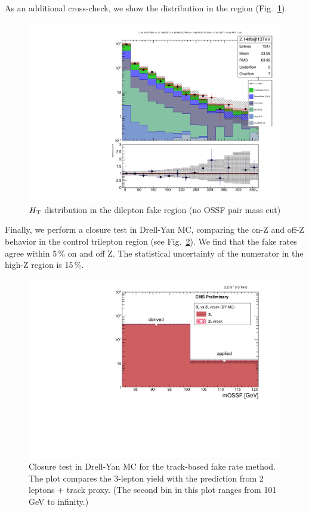 As an additional cross-check, we show the \HT distribution in the \Z region (Fig.~\ref{fig:fakeLight_Z_HT}).
\begin{figure}
\begin{center}
	\includegraphics[width=.7\textwidth]{Background/bkg_fakeLight/Z_HT}
	\caption{$H_{\mathrm{T}}$ distribution in the dilepton fake region (no OSSF pair mass cut)
	\label{fig:fakeLight_Z_HT}}
\end{center}
\end{figure}
Finally, we perform a closure test in Drell-Yan MC, comparing the on-Z and off-Z behavior in the control trilepton region (see Fig.~\ref{fig:fakeLight_closure}). We find that the fake rates agree within 5\,\% on and off Z. The statistical uncertainty of the numerator in the high-Z region is 15\,\%.

\begin{figure}
\begin{center}
	\includegraphics[width=.7\textwidth]{Background/bkg_fakeLight/L3vsL2T1_MOSSF-formatted}
	\caption{Closure test in Drell-Yan MC for the track-based fake rate method. The plot compares the 3-lepton yield with the prediction from 2 leptons + track proxy. (The second bin in this plot ranges from 101 GeV to infinity.)
	\label{fig:fakeLight_closure}}
\end{center}
\end{figure}
